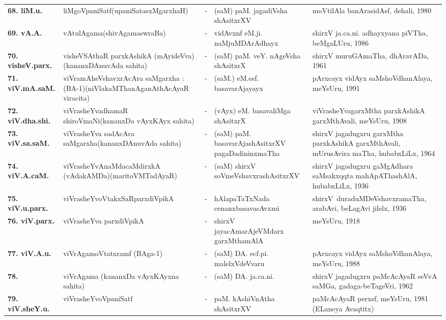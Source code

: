 {\begin{longtable}{@{}lp{5cm}cp{5cm}<{\raggedright}p{3cm}<{\raggedright}@{}}
{\bf 68. liM.u.} & liMgoVpaniSatf\newline (upaniSatasxMgarxhaH) &-& (saM) paM. jagadiVsha shAsitxrXV & moVtilAla banArasidAsf, dehali, 1980\\
{\bf 69. vA.A.} & vAtulAgama\newline (shivAgamaswraBa) &-& vidAvxnf eM.ji. naMjuMDArAdhayx & shirxV ja.ca.ni. adhayxyana piVTha, beMgaLUru, 1986\\
{\bf 70. visheV.parx.} & visheVSAthaR parxkAshikA (mAyideVva)\newline (kananxDAnuvAda sahita) &-& (saM) paM. veY. nAgeVsha shAsitxrX & shirxV muruGAmaTha, dhAravADa, 1961\\
{\bf 71. viV.mA.saM.} & viVramAheVshavxrAcAra saMgarxha : (BA-1)\newline (niVlakaMThanAganAthAcAyaR viracita) &-& (saM.) eM.esf. basavarAjayayx & pArxcayx vidAyx saMshoVdhanAlaya, meYsUru, 1991\\
{\bf 72. viV.dha.shi.} & viVrasheYvadhamaR shiroVmaNi\newline (kananxDa vAyxKAyx sahita) &-& (vAyx) eM. basavaliMga shAsitxrX & viVrasheYvagarxMtha parxkAshikA garxMthAvali, meYsUru, 1908\\
{\bf 73. viV.sa.saM.} & viVrasheYva sadAcAra saMgarxha\newline (kananxDAnuvAda sahita) &-& (saM) paM. basavarAjashAsitxrXV pagaDadininxmaTha & shirxV jagadugxru garxMtha parxkAshikA garxMthAvali, mUrusAvira maTha, hubabxLiLx, 1964\\
{\bf 74. viV.A.caM.} & viVrasheYvAnaMdacaMdirxkA (vAdakAMDa)\newline (maritoVMTadAyaR) &-& (saM) shirxV soVmeVshavxrashAsitxrXV & shirxV jagadugxru gaMgAdhara saMsakxqqta mahApAThashAlA, hubabxLiLx, 1936\\
{\bf 75. viV.u.parx.} & viVrasheYvoVtakxSaRparxdiVpikA &-& hAlapaTaTxNada cenanxbasavasAvxmi & \hbox{shirxV duraduMDeVshavxra}\-maTha, arabAvi, beLagAvi jilelx, 1936\\
{\bf 76. viV.parx.} & viVrasheYva parxdiVpikA &-& shirxV jayacAmarAjeVMdarx garxMthamAlA & meYsUru, 1918\\
{\bf 77. viV.A.u.} & viVrAgamoVtatxramf (BAga-1) &-& (saM) DA. ecf.pi. malelxVdeVvaru & pArxcayx vidAyx saMshoVdhanAlaya, meYsUru, 1988\\
{\bf 78. } & viVrAgama (kananxDa vAyxKAyxna sahita) &-& (saM) DA. ja.ca.ni. & shirxV jagadugxru paMcAcAyaR seVvA saMGa, gadaga-beTageVri, 1962\\
{\bf 79. viV.sheY.u.} & viVrasheYvoVpaniSatf &-& paM. kAshiVnAtha shAsitxrXV & paMcAcAyaR perxsf, meYsUru, 1981 (ELaneya Avaqtitx)\\

\end{longtable}}
